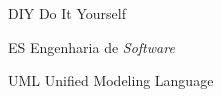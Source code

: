 
\begin{siglas}
    \item[DIY] Do It Yourself
    \item[ES] Engenharia de \textit{Software}
    \item[UML] Unified Modeling Language
\end{siglas}


